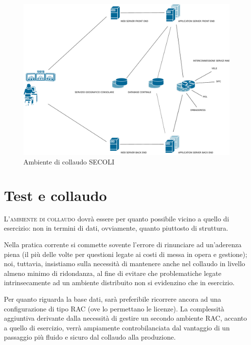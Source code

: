 \documentclass[headinclude,footinclude,a4paper,11pt,final]{scrreprt}
\begin{document}
\begin{figure}[ht]
\includegraphics[scale=0.43]{collaudo.pdf}
\bigskip
\caption{Ambiente di collaudo SECOLI}
\bigskip
\bigskip
\end{figure}

\section{Test e collaudo}

\lettrine{L'}{ambiente di collaudo} dovrà essere per quanto possibile vicino a quello di esercizio: non in termini di dati, ovviamente, quanto piuttosto di struttura.

Nella pratica corrente si commette sovente l'errore di rinunciare ad un'aderenza piena (il più delle volte per questioni legate ai costi di messa in opera e gestione); noi, tuttavia, insistiamo sulla necessità di mantenere anche nel collaudo in livello almeno minimo di ridondanza, al fine di evitare che problematiche legate intrinsecamente ad un ambiente distribuito non si evidenzino che in esercizio.

Per quanto riguarda la base dati, sarà preferibile ricorrere ancora ad una configurazione di tipo RAC (ove lo permettano le licenze).  La complessità aggiuntiva derivante dalla necessità di gestire un secondo ambiente RAC, accanto a quello di esercizio, verrà ampiamente controbilanciata dal vantaggio di un passaggio più fluido e sicuro dal collaudo alla produzione.

\bigskip
\end{document}
